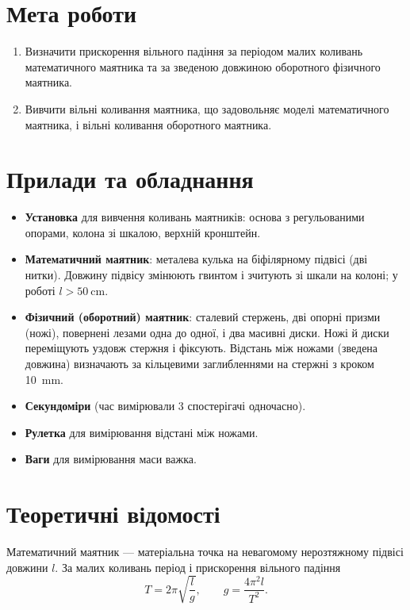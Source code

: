 \documentclass[ukrainian]{ucaphyslab}
\begin{document}
\maketitlepage

\section{Мета роботи}
\begin{enumerate}
  \item Визначити прискорення вільного падіння за періодом малих коливань математичного маятника та за зведеною довжиною оборотного фізичного маятника.
  \item Вивчити вільні коливання маятника, що задовольняє моделі математичного маятника, і вільні коливання оборотного маятника.
\end{enumerate}

\section{Прилади та обладнання}
\begin{itemize}
  \item \textbf{Установка} для вивчення коливань маятників: основа з регульованими опорами, колона зі шкалою, верхній кронштейн.
  \item \textbf{Математичний маятник}: металева кулька на біфілярному підвісі (дві нитки). Довжину підвісу змінюють гвинтом і зчитують зі шкали на колоні; у роботі \(l > \SI{50}{\centi\meter}\).
  \item \textbf{Фізичний (оборотний) маятник}: сталевий стержень, дві опорні призми (ножі), повернені лезами одна до одної, і два масивні диски. Ножі й диски переміщують уздовж стержня і фіксують. Відстань між ножами (зведена довжина) визначають за кільцевими заглибленнями на стержні з кроком \SI{10}{\milli\meter}.
  \item \textbf{Секундоміри} (час вимірювали 3 спостерігачі одночасно).
  \item \textbf{Рулетка} для вимірювання відстані між ножами.
  \item \textbf{Ваги} для вимірювання маси важка.
\end{itemize}


\section{Теоретичні відомості}
Математичний маятник — матеріальна точка на невагомому нерозтяжному підвісі довжини \(l\). За малих коливань період і прискорення вільного падіння
\begin{equation}
  T = 2\pi\sqrt{\frac{l}{g}}, \qquad
  g = \frac{4\pi^{2} l}{T^{2}}.
  \tag{2.13}
  \label{eq:g-math}
\end{equation}
\end{document}
